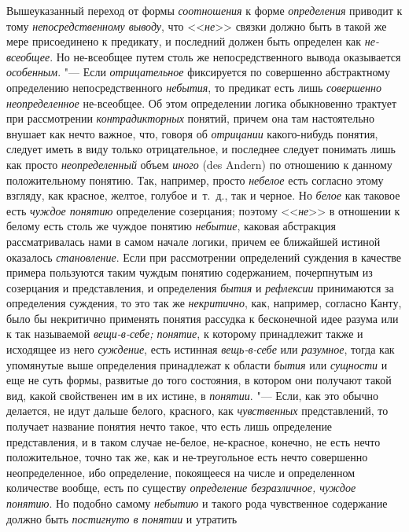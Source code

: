 Вышеуказанный переход от формы {\em соотношения} к форме {\em определения}
приводит к тому {\em непосредственному выводу}, что <<{\em не}>> связки должно
быть в такой же мере присоединено к предикату, и последний должен быть
определен как {\em не-всеобщее}. Но не-всеобщее путем столь же
непосредственного вывода оказывается {\em особенным}. "--- Если
{\em отрицательное} фиксируется по совершенно абстрактному определению
непосредственного {\em небытия}, то предикат есть лишь {\em совершенно
неопределенное} не-всеобщее. Об этом определении логика обыкновенно трактует
при рассмотрении {\em контрадикторных} понятий, причем она там настоятельно
внушает как нечто важное, что, говоря об {\em отрицании} какого-нибудь понятия,
следует иметь в виду только отрицательное, и последнее следует понимать лишь
как просто {\em неопределенный} объем {\em иного} (des Andern) по отношению к
данному положительному понятию. Так, например, просто {\em небелое} есть
согласно этому взгляду, как красное, желтое, голубое и~т.~д., так и черное.
Но {\em белое} как таковое есть {\em чуждое понятию} определение созерцания;
поэтому <<{\em не}>> в отношении к белому есть столь же чуждое понятию
{\em небытие}, каковая абстракция рассматривалась нами в самом начале логики,
причем ее ближайшей истиной оказалось {\em становление}. Если при рассмотрении
определений суждения в качестве примера пользуются таким чуждым понятию
содержанием, почерпнутым из созерцания и представления, и определения
{\em бытия} и {\em рефлексии} принимаются за определения суждения, то это так
же {\em некритично}, как, например, согласно Канту, было бы некритично
применять понятия рассудка к бесконечной идее разума или к так называемой
{\em вещи-в-себе; понятие}, к которому принадлежит также и исходящее из него
{\em суждение}, есть истинная {\em вещь-в-себе} или {\em разумное}, тогда как
упомянутые выше определения принадлежат к области {\em бытия} или
{\em сущности} и еще не суть формы, развитые до того состояния, в котором они
получают такой вид, какой свойственен им в их истине, в {\em понятии}. "---
Если, как это обычно делается, не идут дальше белого, красного, как
{\em чувственных} представлений, то получает название понятия нечто такое, что
есть лишь определение представления, и в таком случае не-белое, не-красное,
конечно, не есть нечто положительное, точно так же, как и не-треугольное есть
нечто совершенно неопределенное, ибо определение, покоящееся на числе и
определенном количестве вообще, есть по существу {\em определение
безразличное, чуждое понятию}. Но подобно самому {\em небытию} и такого
рода чувственное содержание должно быть {\em постигнуто в понятии} и утратить
